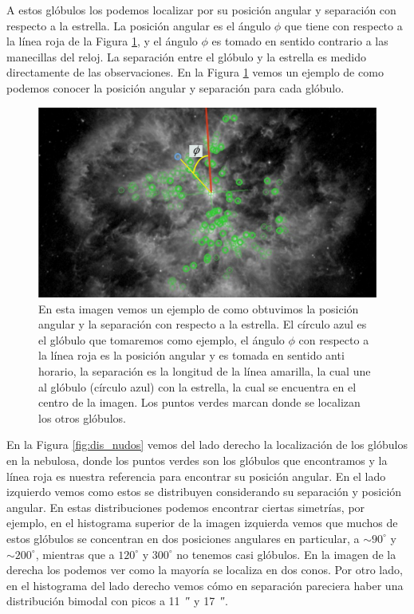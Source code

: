 \documentclass{book}
\begin{document}
A estos glóbulos los podemos localizar por su posición angular y separación con respecto a la estrella. La posición angular es el ángulo $\phi$ que tiene con respecto a la línea roja de la Figura \ref{fig:ejemplo_PA_Sep}, y el ángulo $\phi$ es tomado en sentido contrario a las manecillas del reloj. La separación entre el glóbulo y la estrella es medido directamente de las observaciones. En la Figura \ref{fig:ejemplo_PA_Sep} vemos un ejemplo de como podemos conocer la posición angular y separación para cada glóbulo.

\begin{figure}[htb]
    \centering
    \includegraphics[width=\textwidth]{ultimos/ejemplo_phi.pdf}
    \caption{En esta imagen vemos un ejemplo de como obtuvimos la posición angular y la separación con respecto a la estrella. El círculo azul es el glóbulo que tomaremos como ejemplo, el ángulo $\phi$ con respecto a la línea roja es la posición angular y es tomada en sentido anti horario, la separación es la longitud de la línea amarilla, la cual une al glóbulo (círculo azul) con la estrella, la cual se encuentra en el centro de la imagen. Los puntos verdes marcan donde se localizan los otros glóbulos.}
    \label{fig:ejemplo_PA_Sep}
\end{figure}

En la Figura \ref{fig:dis_nudos} vemos del lado derecho la localización de los glóbulos en la nebulosa, donde los puntos verdes son los glóbulos que encontramos y la línea roja es nuestra referencia para encontrar su posición angular. En el lado izquierdo vemos como estos se distribuyen considerando su separación y posición angular. En estas distribuciones podemos encontrar ciertas simetrías, por ejemplo, en el histograma superior de la imagen izquierda vemos que muchos de estos glóbulos se concentran en dos posiciones angulares en particular, a $\sim90^\circ$ y $\sim200^\circ$, mientras que a $120^\circ$ y $300^\circ$ no tenemos casi glóbulos. En la imagen de la derecha los podemos ver como la mayoría se localiza en dos conos. Por otro lado, en el histograma del lado derecho vemos cómo en separación pareciera haber una distribución bimodal con picos a \SI{11}{\arcsecond} y \SI{17}{\arcsecond}.
\end{document}
